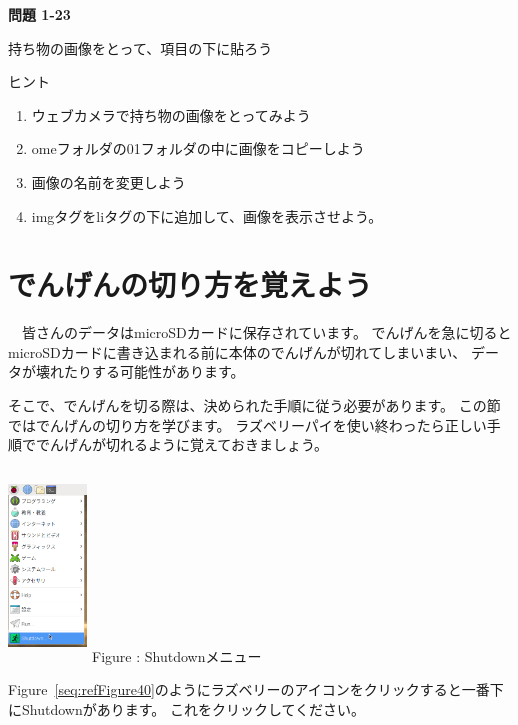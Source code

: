 \documentclass[a4paper,12pt]{jarticle}
\newcounter{Figure}
\renewcommand\theFigure{\arabic{Figure}}
\begin{document}
\bigskip
\flushleft

{\bfseries
問題 1-23}

持ち物の画像をとって、項目の下に貼ろう

ヒント

\begin{enumerate}
\item
ウェブカメラで持ち物の画像をとってみよう
\item
omeフォルダの01フォルダの中に画像をコピーしよう
\item 画像の名前を変更しよう
\item
imgタグをliタグの下に追加して、画像を表示させよう。
\end{enumerate}

\bigskip


\clearpage\section{でんげんの切り方を覚えよう}
\ \ 皆さんのデータはmicroSDカードに保存されています。
でんげんを急に切るとmicroSDカードに書き込まれる前に本体のでんげんが切れてしまいまい、
データが壊れたりする可能性があります。

そこで、でんげんを切る際は、決められた手順に従う必要があります。
この節ではでんげんの切り方を学びます。
ラズベリーパイを使い終わったら正しい手順ででんげんが切れるように覚えておきましょう。



\centering
\begin{minipage}{8.115cm}
{\upshape
\centering
\includegraphics[width=2.1cm,height=5.1cm]{textbook-img206.png}
\newline
Figure {\theFigure\label{seq:refFigure40}}: Shutdownメニュー}
\end{minipage}
\begin{minipage}{7.115cm}
Figure~\ref{seq:refFigure40}のようにラズベリーのアイコンをクリックすると一番下にShutdownがあります。
これをクリックしてください。
\end{minipage}
\bigskip
\end{document}
